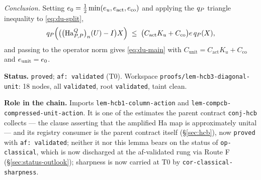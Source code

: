 \emph{Conclusion.} Setting $e_0=\tfrac12\min(e_u,e_{\mathrm{act}},e_{\mathrm{co}})$
and applying the $q_{P}$ triangle inequality to \eqref{eq:du-split},
\[
  q_{P}\Bigl(\bigl(\bigl(\mathrm{Ha}^{Q}_{P,P}\bigr)_{n}(U)-I\bigr)X\Bigr)
  \;\le\;\bigl(C_{\mathrm{act}}K_u+C_{\mathrm{co}}\bigr)e\,q_{P}(X),
\]
and passing to the operator norm gives \eqref{eq:du-main} with
$C_{\mathrm{unit}}=C_{\mathrm{act}}K_u+C_{\mathrm{co}}$ and
$e_{\mathrm{unit}}=e_0$.

\medskip
\noindent\textbf{Status.} \texttt{proved}; \texttt{af: validated} (T0). Workspace
\texttt{proofs/lem-hcb3-diagonal-unit}: 18 nodes, all \texttt{validated}, root
\texttt{validated}, taint clean.

\noindent\textbf{Role in the chain.} Imports
\texttt{lem-hcb1-column-action} and
\texttt{lem-compcb-compressed-unit-action}. It is one of the estimates the parent
contract \texttt{conj-hcb} collects --- the clause asserting that the amplified Ha map is
approximately unital --- and its registry consumer is the parent contract itself
(\S\ref{sec:hcb}), now \texttt{proved} with \texttt{af: validated}; neither it nor this
lemma bears on the status of \texttt{op-classical}, which is now discharged at the af-validated rung via Route F (\S\ref{sec:status-outlook}); sharpness is now carried at T0 by \texttt{cor-classical-sharpness}.
